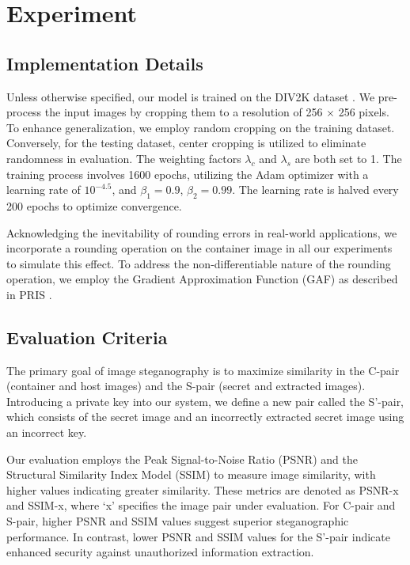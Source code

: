 \documentclass{article}
\begin{document}
\section{Experiment}
\subsection{Implementation Details}
Unless otherwise specified, our model is trained on the DIV2K dataset \cite{agustsson2017ntire}. We pre-process the input images by cropping them to a resolution of 256 $\times$ 256 pixels. To enhance generalization, we employ random cropping on the training dataset. Conversely, for the testing dataset, center cropping is utilized to eliminate randomness in evaluation. The weighting factors $\lambda_c$ and $\lambda_s$ are both set to 1. The training process involves 1600 epochs, utilizing the Adam optimizer with a learning rate of $10^{-4.5}$, and $\beta_1=0.9$, $\beta_2=0.99$. The learning rate is halved every 200 epochs to optimize convergence.

Acknowledging the inevitability of rounding errors in real-world applications, we incorporate a rounding operation on the container image in all our experiments to simulate this effect. To address the non-differentiable nature of the rounding operation, we employ the Gradient Approximation Function (GAF) as described in PRIS \cite{yang2023pris}.

\subsection{Evaluation Criteria}
The primary goal of image steganography is to maximize similarity in the C-pair (container and host images) and the S-pair (secret and extracted images). Introducing a private key into our system, we define a new pair called the S'-pair, which consists of the secret image and an incorrectly extracted secret image using an incorrect key. 

Our evaluation employs the Peak Signal-to-Noise Ratio (PSNR) and the Structural Similarity Index Model (SSIM) \cite{setiadi2021psnr} to measure image similarity, with higher values indicating greater similarity. These metrics are denoted as PSNR-x and SSIM-x, where `x' specifies the image pair under evaluation. For C-pair and S-pair, higher PSNR and SSIM values suggest superior steganographic performance. In contrast, lower PSNR and SSIM values for the S'-pair indicate enhanced security against unauthorized information extraction.
\end{document}
